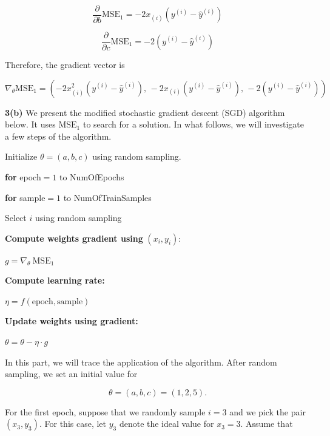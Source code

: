 \documentclass[12pt]{article}
\begin{document}
	\[
	\frac{\partial}{\partial b}\mathrm{MSE}_1
	=
	-2x_{(i)}
	\left(
	y^{(i)}-\hat{y}^{(i)}
	\right)
	\]
	
	\[
	\frac{\partial}{\partial c}\mathrm{MSE}_1
	=
	-2
	\left(
	y^{(i)}-\hat{y}^{(i)}
	\right)
	\]
	
	Therefore, the gradient vector is
	
	\[
	\nabla_{\theta}\mathrm{MSE}_1
	=
	\left(
	-2x_{(i)}^2(y^{(i)}-\hat{y}^{(i)}),
	\,
	-2x_{(i)}(y^{(i)}-\hat{y}^{(i)}),
	\,
	-2(y^{(i)}-\hat{y}^{(i)})
	\right)
	\]
	
	\newpage
	
	\noindent\textbf{3(b)} We present the modified stochastic gradient descent (SGD) algorithm below. It uses \(\mathrm{MSE}_1\) to search for a solution. In what follows, we will investigate a few steps of the algorithm.
	
	\begin{flushleft}
		Initialize $\theta=(a,b,c)$ using random sampling.
		
		\textbf{for} epoch$=1$ to NumOfEpochs
		
		\hspace*{1cm}\textbf{for} sample$=1$ to NumOfTrainSamples
		
		\hspace*{2cm}Select $i$ using random sampling
		
		\hspace*{2cm}\textbf{Compute weights gradient using }$(x_i,y_i)$:
		
		\hspace*{3cm}$g=\nabla_{\theta}\ \mathrm{MSE}_1$
		
		\hspace*{2cm}\textbf{Compute learning rate:}
		
		\hspace*{3cm}$\eta=f(\mathrm{epoch},\mathrm{sample})$
		
		\hspace*{2cm}\textbf{Update weights using gradient:}
		
		\hspace*{3cm}$\theta=\theta-\eta\cdot g$
	\end{flushleft}
	
	In this part, we will trace the application of the algorithm. After random sampling, we set an initial value for
	
	\[
	\theta=(a,b,c)=(1,2,5).
	\]
	
	For the first epoch, suppose that we randomly sample \(i=3\) and we pick the pair \((x_3,y_3)\). For this case, let \(y_3\) denote the ideal value for \(x_3=3\). Assume that
	
\end{document}
